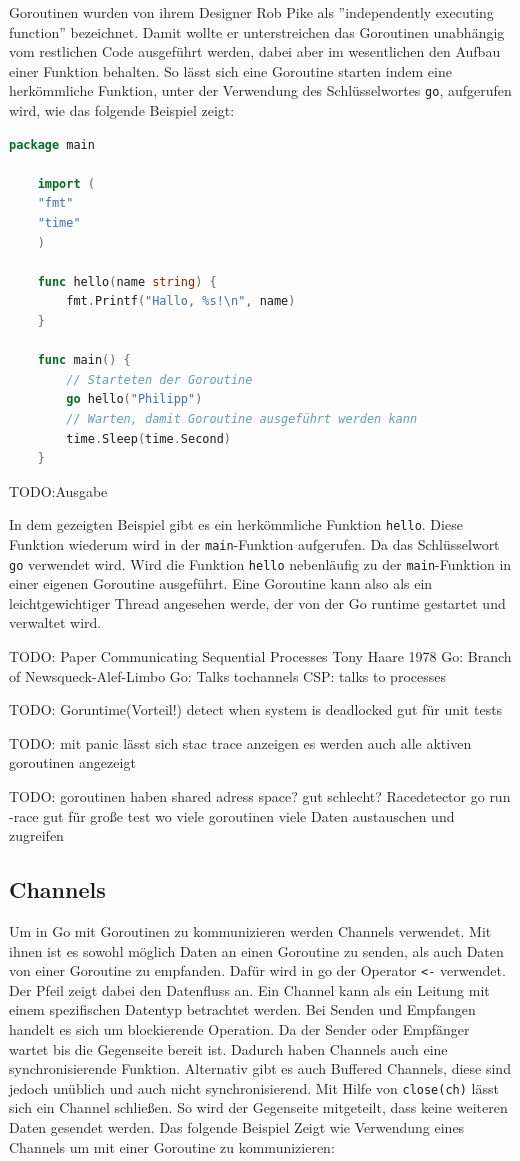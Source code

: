 \documentclass[fontsize=12pt,paper=a4,twoside=semi,parskip=half-,headsepline,headinclude]{scrreprt}
\begin{document}
Goroutinen wurden von ihrem Designer Rob Pike als ''independently executing function'' bezeichnet. Damit wollte er unterstreichen das Goroutinen unabhängig vom restlichen Code ausgeführt werden, dabei aber im wesentlichen den Aufbau einer Funktion behalten. So lässt sich eine Goroutine starten indem eine herkömmliche Funktion, unter der Verwendung des Schlüsselwortes \texttt{go}, aufgerufen wird, wie das folgende Beispiel zeigt:

\begin{lstlisting}[language=Go,extendedchars=true]
	package main
	
	import (
	"fmt"
	"time"
	)
	
	func hello(name string) {
		fmt.Printf("Hallo, %s!\n", name)
	}
	
	func main() {
		// Starteten der Goroutine
		go hello("Philipp")
		// Warten, damit Goroutine ausgeführt werden kann
		time.Sleep(time.Second)
	}
\end{lstlisting}
TODO:Ausgabe

In dem gezeigten Beispiel gibt es ein herkömmliche Funktion \texttt{hello}. Diese Funktion wiederum wird in der \texttt{main}-Funktion aufgerufen. Da das Schlüsselwort \texttt{go} verwendet wird. Wird die Funktion \texttt{hello} nebenläufig zu der \texttt{main}-Funktion in einer eigenen Goroutine ausgeführt. Eine Goroutine kann also als ein leichtgewichtiger Thread angesehen werde, der von der Go runtime gestartet und verwaltet wird.

TODO:
Paper Communicating Sequential Processes Tony Haare 1978
Go: Branch of Newsqueck-Alef-Limbo
Go: Talks tochannels
CSP: talks to processes

TODO:
Goruntime(Vorteil!)
detect when system is deadlocked
gut für unit tests

TODO:
mit panic lässt sich stac trace anzeigen
es werden auch alle aktiven goroutinen angezeigt

TODO:
goroutinen haben shared adress space? gut schlecht?
Racedetector
go run -race
gut für große test wo viele goroutinen viele Daten austauschen und zugreifen

\subsection{Channels}

Um in Go mit Goroutinen zu kommunizieren werden Channels verwendet. Mit ihnen ist es sowohl möglich Daten an einen Goroutine zu senden, als auch Daten von einer Goroutine zu empfanden. Dafür wird in go der Operator \texttt{<-} verwendet. Der Pfeil zeigt dabei den Datenfluss an. Ein Channel kann als ein Leitung mit einem spezifischen Datentyp betrachtet werden. Bei Senden und Empfangen handelt es sich um blockierende Operation. Da der Sender oder Empfänger wartet bis die Gegenseite bereit ist. Dadurch haben Channels auch eine synchronisierende Funktion. Alternativ gibt es auch Buffered Channels, diese sind jedoch unüblich und auch nicht synchronisierend. Mit Hilfe von \texttt{close(ch)} lässt sich ein Channel schließen. So wird der Gegenseite mitgeteilt, dass keine weiteren Daten gesendet werden. Das folgende Beispiel Zeigt wie Verwendung eines Channels um mit einer Goroutine zu kommunizieren:
\end{document}
